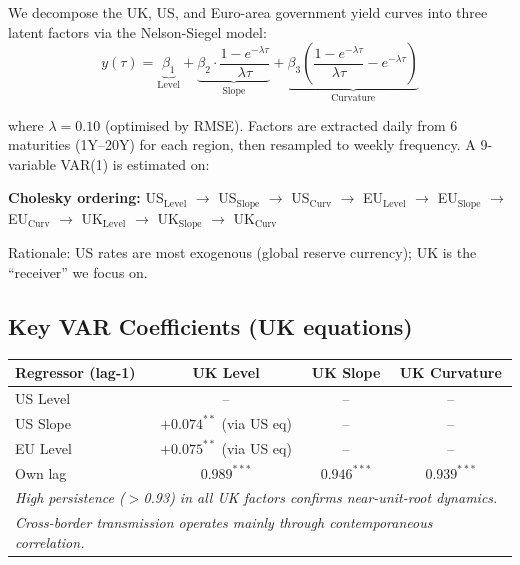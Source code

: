 \documentclass[11pt,a4paper]{article}
\begin{document}
We decompose the UK, US, and Euro-area government yield curves into three latent factors via the Nelson-Siegel model:
\begin{equation*}
    y(\tau) = \underbrace{\beta_1}_{\text{Level}} + \underbrace{\beta_2 \cdot \frac{1-e^{-\lambda\tau}}{\lambda\tau}}_{\text{Slope}} + \underbrace{\beta_3 \left(\frac{1-e^{-\lambda\tau}}{\lambda\tau} - e^{-\lambda\tau}\right)}_{\text{Curvature}}
\end{equation*}

\noindent where $\lambda=0.10$ (optimised by RMSE). Factors are extracted daily from 6 maturities (1Y--20Y) for each region, then resampled to weekly frequency. A 9-variable VAR(1) is estimated on:

\smallskip
\noindent\textbf{Cholesky ordering:} US$_{\text{Level}}$ $\rightarrow$ US$_{\text{Slope}}$ $\rightarrow$ US$_{\text{Curv}}$ $\rightarrow$ EU$_{\text{Level}}$ $\rightarrow$ EU$_{\text{Slope}}$ $\rightarrow$ EU$_{\text{Curv}}$ $\rightarrow$ UK$_{\text{Level}}$ $\rightarrow$ UK$_{\text{Slope}}$ $\rightarrow$ UK$_{\text{Curv}}$

\smallskip
\noindent Rationale: US rates are most exogenous (global reserve currency); UK is the ``receiver'' we focus on.

\vspace{-0.2cm}
\subsection*{Key VAR Coefficients (UK equations)}

\begin{table}[H]
\centering\small
\begin{tabular}{lccc}
\toprule
\textbf{Regressor (lag-1)} & \textbf{UK Level} & \textbf{UK Slope} & \textbf{UK Curvature} \\
\midrule
US Level  & -- & -- & -- \\
US Slope  & $+0.074^{**}$ (via US eq) & -- & -- \\
EU Level  & $+0.075^{**}$ (via US eq) & -- & -- \\
Own lag   & $0.989^{***}$ & $0.946^{***}$ & $0.939^{***}$ \\
\midrule
\multicolumn{4}{l}{\textit{High persistence ($>$0.93) in all UK factors confirms near-unit-root dynamics.}} \\
\multicolumn{4}{l}{\textit{Cross-border transmission operates mainly through contemporaneous correlation.}} \\
\bottomrule
\end{tabular}
\end{table}
\end{document}
